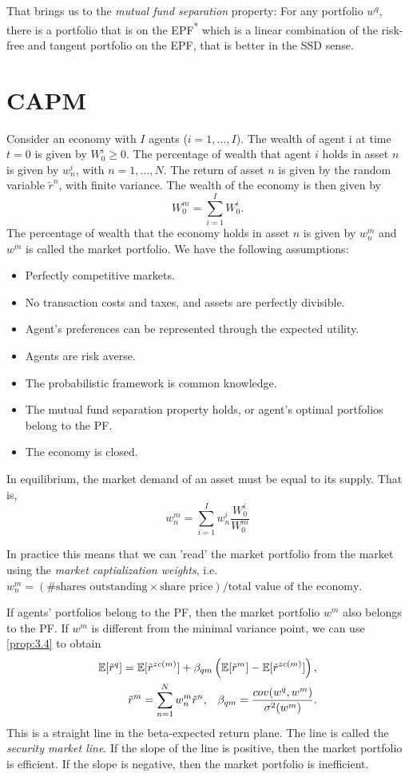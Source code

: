 \documentclass[twoside, titlepage]{article}
\begin{document}
That brings us to the \textit{mutual fund separation} property: For any portfolio $w^q$, there is a portfolio that is on the EPF\textsuperscript{*} which is a linear combination of the risk-free and tangent portfolio on the EPF, that is better in the SSD sense. 

\section{CAPM}

Consider an economy with $I$ agents ($i = 1, \dots, I$). The wealth of agent i at time $t=0$ is given by $W^i_0 \geq 0$. The percentage of wealth that agent $i$ holds in asset $n$ is given by $w^i_n$, with $n = 1, \dots, N$. The return of asset $n$ is given by the random variable $\tilde{r}^n$, with finite variance. The wealth of the economy is then given by
\[
    W_0^m = \sum_{i=1}^{I} W_0^i.
\]
The percentage of wealth that the economy holds in asset $n$ is given by
$w^m_n$ and $w^m$ is called the market portfolio. We have the following assumptions:
\begin{itemize}
    \item Perfectly competitive markets.
    \item No transaction costs and taxes, and assets are perfectly divisible.
    \item Agent's preferences can be represented through the expected utility.
    \item Agents are risk averse.
    \item The probabilistic framework is common knowledge.
    \item The mutual fund separation property holds, or agent's optimal portfolios belong to the PF.
    \item The economy is closed.
\end{itemize}

In equilibrium, the market demand of an asset must be equal to its supply. That is,
\[
    w^m_n = \sum_{i=1}^{I} w^i_n \frac{W^i_0}{W^m_0}
\]
\begin{remark}
    In practice this means that we can 'read' the market portfolio from the market using the \textit{market captialization weights}, i.e. $w^m_n = (\# \text{shares outstanding} \times \text{share price}) / \text{total value of the economy}$.
\end{remark}
If agents' portfolios belong to the PF, then the market portfolio $w^m$ also belongs to the PF. If $w^m$ is different from the minimal variance point, we can use \cref{prop:3.4} to obtain
\begin{align*}
    \mathbb{E}[\tilde{r}^q] = \mathbb{E}[\tilde{r}^{zc(m)}] + \beta_{qm}\left(\mathbb{E}[\tilde{r}^m] - \mathbb{E}[\tilde{r}^{zc(m)}]\right), \\
    \tilde{r}^m = \sum_{n=1}^{N} w^m_n \tilde{r}^n, \;\;\; \beta_{qm} = \frac{cov(w^q, w^m)}{\sigma^2(w^m)}.
\end{align*}
This is a straight line in the beta-expected return plane. The line is called the \textit{security market line}. If the slope of the line is positive, then the market portfolio is efficient. If the slope is negative, then the market portfolio is inefficient. 
\end{document}
